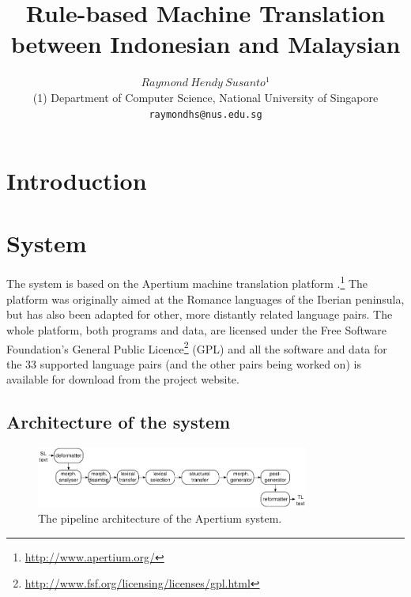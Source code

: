 \documentclass[10pt,a5paper,twoside]{article}
\title{Rule-based Machine Translation between Indonesian and Malaysian}
\author{$Raymond~Hendy~Susanto^{1}$\\
{\small  	(1) Department of Computer Science, National University of Singapore\\ 
  \texttt{raymondhs@nus.edu.sg} \\ 
}}
\begin{document}
\maketitle



\newpage
\section{Introduction}

\section{System}
The system is based on the Apertium machine translation platform \citep{apertium/2011}.\footnote{\url{http://www.apertium.org/}} The platform was originally aimed at the Romance languages of the Iberian peninsula, but has also been adapted for other, more distantly related language pairs. The whole platform, both programs and data, are licensed under the Free Software Foundation's General Public Licence\footnote{\url{http://www.fsf.org/licensing/licenses/gpl.html}} (GPL) and all the software and data for the 33 supported language pairs (and the other pairs being worked on) is available for download from the project website.

\subsection{Architecture of the system}

\begin{figure}[htbp]
\begin{center}
 \includegraphics[width=0.8\textwidth]{architecture.pdf}
\end{center}
\caption{The pipeline architecture of the Apertium system.}
\label{fig:modules}
\end{figure}
\end{document}
